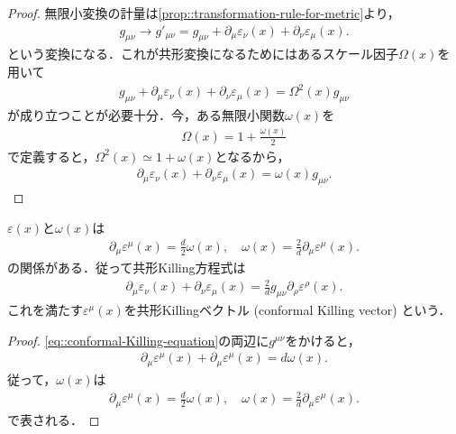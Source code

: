 \begin{proof}
	無限小変換の計量は\cref{prop::transformation-rule-for-metric}より，
	\begin{align}
		g_{\mu\nu}\longrightarrow{}g'_{\mu\nu}=g_{\mu\nu}+\partial_{\mu}\varepsilon_{\nu}(x)+\partial_{\nu}\varepsilon_{\mu}(x).
	\end{align}
	という変換になる．これが共形変換になるためにはあるスケール因子\(\Omega(x)\)を用いて
	\begin{align}
		g_{\mu\nu}+\partial_{\mu}\varepsilon_{\nu}(x)+\partial_{\nu}\varepsilon_{\mu}(x)=\Omega^{2}(x)g_{\mu\nu}
	\end{align}
	が成り立つことが必要十分．今，ある無限小関数\(\omega(x)\)を
	\begin{align}
		\Omega(x)=1+\frac{\omega(x)}{2}
	\end{align}
	で定義すると，\(\Omega^{2}(x)\simeq{}1+\omega(x)\)となるから，
	\begin{align}
		\partial_{\mu}\varepsilon_{\nu}(x)+\partial_{\nu}\varepsilon_{\mu}(x)=\omega(x)g_{\mu\nu}.
	\end{align}
\end{proof}
\begin{prop}
	\(\varepsilon(x)\)と\(\omega(x)\)は
	\begin{align}\label{eq::infinitesimal-scale-factor-and-conformal-killing-vector}
		\partial_{\mu}\varepsilon^{\mu}(x)=\frac{d}{2}\omega(x),\quad{}\omega(x)=\frac{2}{d}\partial_{\mu}\varepsilon^{\mu}(x).
	\end{align}
	の関係がある．従って共形Killing方程式は
	\begin{align}\label{eq::conformal-Killing-equation-2}
		\partial_{\mu}\varepsilon_{\nu}(x)+\partial_{\nu}\varepsilon_{\mu}(x)=\frac{2}{d}g_{\mu\nu}\partial_{\rho}\varepsilon^{\rho}(x).
	\end{align}
	これを満たす\(\varepsilon^{\mu}(x)\)を共形Killingベクトル (conformal Killing vector) という．
\end{prop}
\begin{proof}
	\cref{eq::conformal-Killing-equation}の両辺に\(g^{\mu\nu}\)をかけると，
	\begin{align}
		\partial_{\mu}\varepsilon^{\mu}(x)+\partial_{\mu}\varepsilon^{\mu}(x)=d\omega(x).
	\end{align}
	従って，\(\omega(x)\)は
	\begin{align}
		\partial_{\mu}\varepsilon^{\mu}(x)=\frac{d}{2}\omega(x),\quad{}\omega(x)=\frac{2}{d}\partial_{\mu}\varepsilon^{\mu}(x).
	\end{align}
	で表される．
\end{proof}
